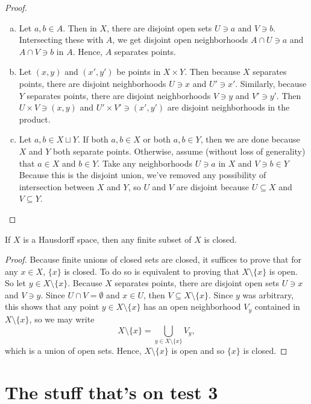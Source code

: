 \documentclass[noname]{notes}
\begin{document}
\begin{proof}
	\begin{enumerate}[(a)]
		\item Let $a, b \in A$. Then in $X$, there are disjoint open sets $U \ni a$ and $V \ni b$. Intersecting these with $A$, we get disjoint open neighborhoods $A \cap U \ni a$ and $A \cap V \ni b$ in $A$. Hence, $A$ separates points. 
		\item Let $(x,y)$ and $(x',y')$ be points in $X \times Y$. Then because $X$ separates points, there are disjoint neighborhoods $U \ni x$ and $U' \ni x'$. Similarly, because $Y$ separates points, there are disjoint neighborhoods $V \ni y$ and $V' \ni y'$. Then $U \times V \ni (x,y)$ and $U' \times V' \ni (x',y')$ are disjoint neighborhoods in the product. 
		\item Let $a, b \in X \sqcup Y$. If both $a, b \in X$ or both $a,b \in Y$, then we are done because $X$ and $Y$ both separate points. Otherwise, assume (without loss of generality) that $a\in X$ and $b \in Y$. Take any neighborhoods $U \ni a$ in $X$ and $V \ni b \in Y$ Because this is the disjoint union, we've removed any possibility of intersection between $X$ and $Y$, so $U$ and $V$ are disjoint because $U \subseteq X$ and $V \subseteq Y$. 
	\end{enumerate}
\end{proof}

\begin{proposition}
	If $X$ is a Hausdorff space, then any finite subset of $X$ is closed. 
\end{proposition}

\begin{proof}
	Because finite unions of closed sets are closed, it suffices to prove that for any $x \in X$, $\{x\}$ is closed. To do so is equivalent to proving that $X \setminus \{x\}$ is open. So let $y \in X \setminus \{x\}$. Because $X$ separates points, there are disjoint open sets $U \ni x$ and $V \ni y$. Since $U \cap V = \emptyset$ and $x \in U$, then $V \subseteq X \setminus \{x\}$. Since $y$ was arbitrary, this shows that any point $y \in X \setminus \{x\}$ has an open neighborhood $V_y$ contained in $X \setminus \{x\}$, so we may write 
	\[
		X \setminus \{x\} = \bigcup_{y \in X \setminus \{x\}} V_y, 
	\]
	which is a union of open sets. Hence, $X \setminus \{x\}$ is open and so $\{x\}$ is closed. 
\end{proof}

\chapter{The stuff that's on test 3}
\end{document}
